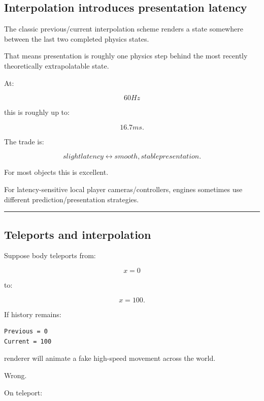 \subsection{Interpolation introduces presentation latency}\label{06-engine-ii-ch037-interpolation-introduces-presentation-latency}

\hypertarget{06-engine-ii-ch037-interpolation-introduces-presentation-latency}{}

The classic previous/current interpolation scheme renders a state somewhere between the last two completed physics states.

That means presentation is roughly one physics step behind the most recently theoretically extrapolatable state.

At:

\[
60Hz
\]

this is roughly up to:

\[
16.7ms.
\]

The trade is:

\[
\boxed{
slight latency
\leftrightarrow
smooth, stable presentation.
}
\]

For most objects this is excellent.

For latency-sensitive local player cameras/controllers, engines sometimes use different prediction/presentation strategies.

\begin{center}\rule{0.5\linewidth}{0.5pt}\end{center}

\subsection{Teleports and interpolation}\label{06-engine-ii-ch037-teleports-and-interpolation}

\hypertarget{06-engine-ii-ch037-teleports-and-interpolation}{}

Suppose body teleports from:

\[
x=0
\]

to:

\[
x=100.
\]

If history remains:

\begin{verbatim}
Previous = 0
Current = 100
\end{verbatim}

renderer will animate a fake high-speed movement across the world.

Wrong.

On teleport:

